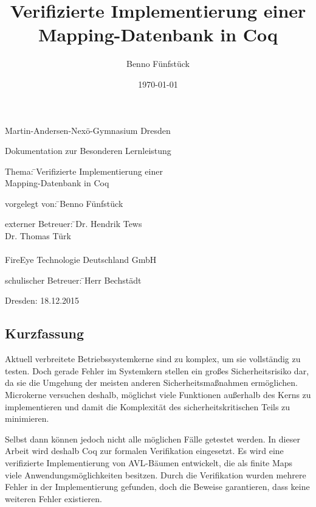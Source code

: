 \documentclass[a4paper, parskip]{scrartcl}
\title{Verifizierte Implementierung einer Mapping-Datenbank in Coq}
\author{Benno Fünfstück}
\date{\today}
\begin{document}
\begin{raggedright}

\sectfont\Large
Martin-Andersen-Nexö-Gymnasium Dresden
\vspace{1.5 cm}


\noindent
Dokumentation zur Besonderen Lernleistung 
\vspace{1.5 cm}

\large
\noindent
\begin{tabbing}
Thema: \=\mdseries Verifizierte Implementierung einer\\
\>\mdseries Mapping-Datenbank in Coq
\end{tabbing}
\vspace{3 cm}

\noindent
\begin{tabbing}
vorgelegt von: \=\mdseries Benno Fünfstück
\end{tabbing}
\vspace{3 cm}

\noindent
\begin{tabbing}
externer Betreuer: \=\mdseries Dr. Hendrik Tews\\
                   \>\mdseries Dr. Thomas Türk\\
                   \\
                   \>\mdseries FireEye Technologie Deutschland GmbH                    
\end{tabbing}
\vspace{1.0 cm}

\noindent
\begin{tabbing}
schulischer Betreuer: \=\mdseries Herr Bechstädt
\end{tabbing}
\vspace{1.0 cm}
Dresden: 18.12.2015

\end{raggedright}
\cleardoublepage


\subsection*{Kurzfassung}
Aktuell verbreitete Betriebssystemkerne sind zu komplex, um sie vollständig zu testen.
Doch gerade Fehler im Systemkern stellen ein großes Sicherheitsrisiko dar, da sie die Umgehung der meisten anderen Sicherheitsmaßnahmen ermöglichen. 
Microkerne versuchen deshalb, möglichst viele Funktionen außerhalb des Kerns zu implementieren und damit die Komplexität des sicherheitskritischen Teils zu minimieren.

Selbst dann können jedoch nicht alle möglichen Fälle getestet werden.
In dieser Arbeit wird deshalb Coq zur formalen Verifikation eingesetzt.
Es wird eine verifizierte Implementierung von AVL-Bäumen entwickelt, die als finite Maps viele Anwendungsmöglichkeiten besitzen.
Durch die Verifikation wurden mehrere Fehler in der Implementierung gefunden, doch die Beweise garantieren, dass keine weiteren Fehler existieren.
\end{document}

